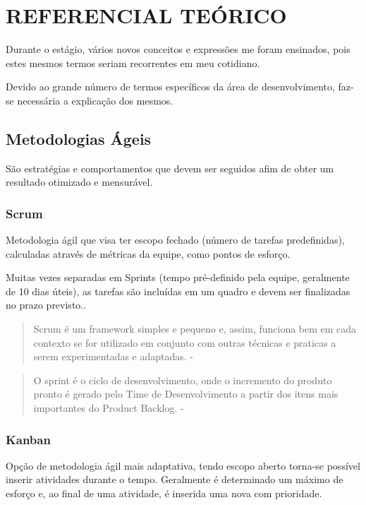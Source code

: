 \chapter{REFERENCIAL TEÓRICO}
\label{cap:elementos}

Durante o estágio, vários novos conceitos e expressões me foram ensinados, pois estes mesmos termos seriam recorrentes em meu cotidiano.

Devido ao grande número de termos específicos da área de desenvolvimento, faz-se necessária a explicação dos mesmos.

\section{Metodologias Ágeis}

São estratégias e comportamentos que devem ser seguidos afim de obter um resultado otimizado e mensurável.

\subsection{Scrum}

Metodologia ágil que visa ter escopo fechado (número de tarefas predefinidas), calculadas através de métricas da equipe, como pontos de esforço.

Muitas vezes separadas em Sprints (tempo pré-definido pela equipe, geralmente de 10 dias úteis), as tarefas são incluídas em um quadro e devem ser finalizadas no prazo previsto..
\begin{quote}
  Scrum é um framework simples e pequeno e, assim, funciona bem em  cada contexto se for utilizado em conjunto com outras técnicas e praticas a serem experimentadas e adaptadas. - \cite{sabbagh2014scrum}
\end{quote}
\begin{quote}
  O sprint é o ciclo de desenvolvimento, onde o incremento do produto pronto é gerado pelo Time de Desenvolvimento a partir dos itens mais importantes do Product Backlog. - \cite{sabbagh2014scrum}
\end{quote}

\subsection{Kanban}
  Opção de metodologia ágil mais adaptativa, tendo escopo aberto torna-se possível inserir atividades durante o tempo.
  Geralmente é determinado um máximo de esforço e, ao final de uma atividade, é inserida uma nova com prioridade.


